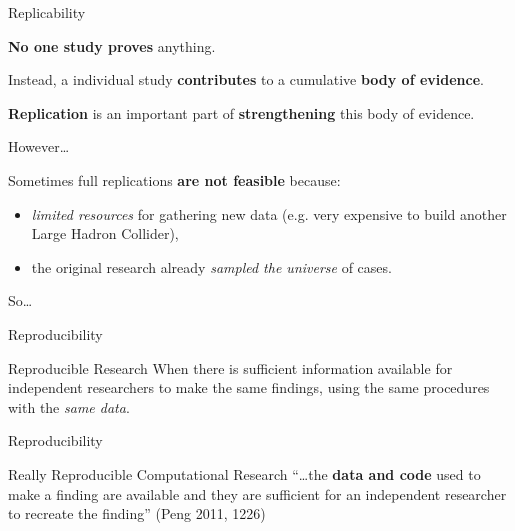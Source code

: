 \documentclass[10pt]{beamer}
\begin{document}
\begin{frame}{Replicability}

    \textbf{No one study proves} anything.

    \vspace{0.5cm}

    Instead, a individual study \textbf{contributes} to a cumulative \textbf{body of evidence}.

    \vspace{0.5cm}

    \textbf{Replication} is an important part of \textbf{strengthening} this body of evidence.

\end{frame}

\begin{frame}{However\ldots}

    Sometimes full replications \textbf{are not feasible} because:

    \begin{itemize}
        \item \emph{limited resources} for gathering new data (e.g. very expensive to build another Large Hadron Collider),

        \vspace{0.5cm}

        \item the original research already \emph{sampled the universe} of cases.
    \end{itemize}

    \vspace{0.5cm}

    {\large{So\ldots}}

\end{frame}

\begin{frame}{Reproducibility}

    \begin{exampleblock}{Reproducible Research}
        When there is sufficient information available for independent researchers to make the same findings, using the same procedures with the \emph{same data}.
    \end{exampleblock}

\end{frame}

\begin{frame}{Reproducibility}

    \begin{exampleblock}{Really Reproducible Computational Research}
        ``\ldots the \textbf{data and code} used to make a finding are available and they are sufficient for an independent researcher to recreate the finding'' (Peng 2011, 1226)
    \end{exampleblock}

\end{frame}
\end{document}
